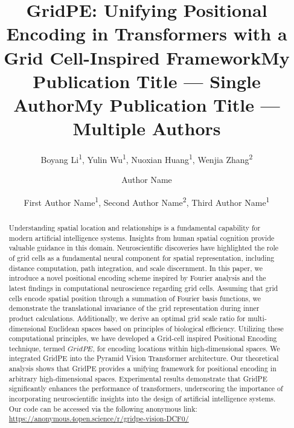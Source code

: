 \documentclass[letterpaper]{article} %
\title{GridPE: Unifying Positional Encoding in Transformers with a Grid Cell-Inspired Framework}
\author{
Boyang Li\equalcontrib\textsuperscript{\rm 1},
Yulin Wu\equalcontrib\textsuperscript{\rm 1},
Nuoxian Huang\textsuperscript{\rm 1},
Wenjia Zhang\textsuperscript{\rm 2}
}
\title{My Publication Title --- Single Author}
\author {
    Author Name
}
\title{My Publication Title --- Multiple Authors}
\author {
    First Author Name\textsuperscript{\rm 1},
    Second Author Name\textsuperscript{\rm 2},
    Third Author Name\textsuperscript{\rm 1}
}
\begin{document}
\maketitle

\begin{abstract}
Understanding spatial location and relationships is a fundamental capability for modern artificial intelligence systems. Insights from human spatial cognition provide valuable guidance in this domain. Neuroscientific discoveries have highlighted the role of grid cells as a fundamental neural component for spatial representation, including distance computation, path integration, and scale discernment. In this paper, we introduce a novel positional encoding scheme inspired by Fourier analysis and the latest findings in computational neuroscience regarding grid cells. Assuming that grid cells encode spatial position through a summation of Fourier basis functions, we demonstrate the translational invariance of the grid representation during inner product calculations. Additionally, we derive an optimal grid scale ratio for multi-dimensional Euclidean spaces based on principles of biological efficiency. Utilizing these computational principles, we have developed a Grid-cell inspired Positional Encoding technique, termed $GridPE$, for encoding locations within high-dimensional spaces. We integrated GridPE into the Pyramid Vision Transformer architecture. Our theoretical analysis shows that GridPE provides a unifying framework for positional encoding in arbitrary high-dimensional spaces. Experimental results demonstrate that GridPE significantly enhances the performance of transformers, underscoring the importance of incorporating neuroscientific insights into the design of artificial intelligence systems. Our code can be accessed via the following anonymous link: \url{https://anonymous.4open.science/r/gridpe-vision-DCF0/}
\end{abstract}
\end{document}
